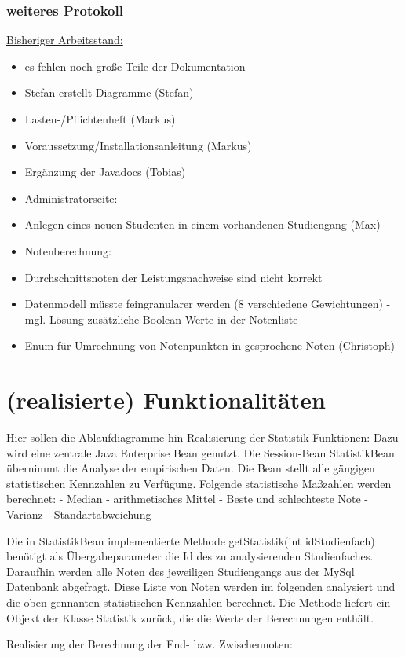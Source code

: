 \documentclass[12pt,a4paper,parskip]{scrreprt}
\begin{document}
\subsection{weiteres Protokoll}
\underline{Bisheriger Arbeitsstand:}
\begin{itemize}
	\item es fehlen noch große Teile der Dokumentation
\item Stefan erstellt Diagramme (Stefan)
\item Lasten-/Pflichtenheft (Markus)
\item Voraussetzung/Installationsanleitung (Markus)
\item Ergänzung der Javadocs (Tobias)
\item Administratorseite:
\item Anlegen eines neuen Studenten in einem vorhandenen Studiengang (Max)
\item Notenberechnung:
\item Durchschnittsnoten der Leistungsnachweise sind nicht korrekt
\item Datenmodell müsste feingranularer werden (8 verschiedene Gewichtungen)			- mgl. Lösung zusätzliche Boolean Werte in der Notenliste
\item Enum für Umrechnung von Notenpunkten in gesprochene Noten (Christoph)
\end{itemize}
\chapter{(realisierte) Funktionalitäten}
Hier sollen die Ablaufdiagramme hin
Realisierung der Statistik-Funktionen:
Dazu wird eine zentrale Java Enterprise Bean genutzt. Die Session-Bean StatistikBean übernimmt die Analyse der empirischen Daten. Die Bean stellt alle gängigen statistischen Kennzahlen zu Verfügung.
Folgende statistische Maßzahlen werden berechnet:
- Median
- arithmetisches Mittel
- Beste und schlechteste Note
- Varianz
- Standartabweichung

Die in StatistikBean implementierte Methode getStatistik(int idStudienfach) benötigt als Übergabeparameter die Id des zu analysierenden Studienfaches. Daraufhin werden alle Noten des jeweiligen Studiengangs aus der MySql Datenbank abgefragt. Diese Liste von Noten werden im folgenden analysiert und die oben gennanten statistischen Kennzahlen berechnet. Die Methode liefert ein Objekt der Klasse Statistik zurück, die die Werte der Berechnungen enthält.


Realisierung der Berechnung der End- bzw. Zwischennoten:
\end{document}
